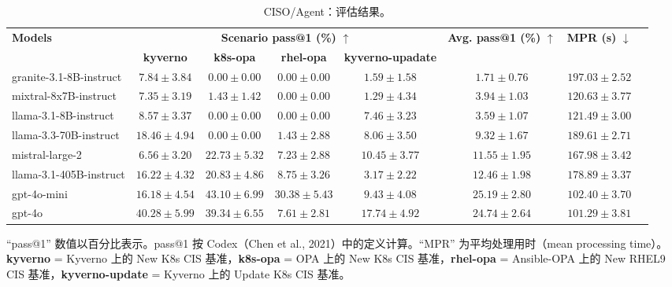 \documentclass[10pt,UTF8,fontset=fandol]{ctexart}
\begin{document}
\begin{table}[H]
\centering
\caption{CISO/Agent：评估结果。}
\label{tab:itbench-24}
\begin{adjustbox}{max width=\linewidth}
\begin{tabular}{lccccccc}
\toprule
\multirow{2}{*}{\textbf{Models}} & \multicolumn{4}{c}{\textbf{Scenario pass@1 (\%)} $\uparrow$} & \multirow{2}{*}{\textbf{Avg. pass@1 (\%)} $\uparrow$} & \multirow{2}{*}{\textbf{MPR (s)} $\downarrow$} \\
\cmidrule(lr){2-5}
 & \textbf{kyverno} & \textbf{k8s-opa} & \textbf{rhel-opa} & \textbf{kyverno-upadate} & & \\
\midrule
granite-3.1-8B-instruct  & $7.84 \pm 3.84$  & $0.00 \pm 0.00$  & $0.00 \pm 0.00$  & $1.59 \pm 1.58$  & $1.71 \pm 0.76$  & $197.03 \pm 2.52$ \\
mixtral-8x7B-instruct    & $7.35 \pm 3.19$  & $1.43 \pm 1.42$  & $0.00 \pm 0.00$  & $1.29 \pm 4.34$  & $3.94 \pm 1.03$  & $120.63 \pm 3.77$ \\
llama-3.1-8B-instruct    & $8.57 \pm 3.37$  & $0.00 \pm 0.00$  & $0.00 \pm 0.00$  & $7.46 \pm 3.23$  & $3.59 \pm 1.07$  & $121.49 \pm 3.00$ \\
llama-3.3-70B-instruct   & $18.46 \pm 4.94$ & $0.00 \pm 0.00$  & $1.43 \pm 2.88$  & $8.06 \pm 3.50$  & $9.32 \pm 1.67$  & $189.61 \pm 2.71$ \\
mistral-large-2          & $6.56 \pm 3.20$  & $22.73 \pm 5.32$ & $7.23 \pm 2.88$  & $10.45 \pm 3.77$ & $11.55 \pm 1.95$ & $167.98 \pm 3.42$ \\
llama-3.1-405B-instruct  & $16.22 \pm 4.32$ & $20.83 \pm 4.86$ & $8.75 \pm 3.26$  & $3.17 \pm 2.22$  & $12.46 \pm 1.98$ & $178.89 \pm 3.37$ \\
gpt-4o-mini              & $16.18 \pm 4.54$ & $43.10 \pm 6.99$ & $30.38 \pm 5.43$ & $9.43 \pm 4.08$  & $25.19 \pm 2.80$ & $102.40 \pm 3.70$ \\
gpt-4o                   & $40.28 \pm 5.99$ & $39.34 \pm 6.55$ & $7.61 \pm 2.81$  & $17.74 \pm 4.92$ & $24.74 \pm 2.64$ & $101.29 \pm 3.81$ \\
\bottomrule
\end{tabular}
\end{adjustbox}
\par\smallskip
\footnotesize\raggedright
``pass@1'' 数值以百分比表示。pass@1 按 Codex（Chen et al., 2021）中的定义计算。``MPR'' 为平均处理用时（mean processing time）。\\
\textbf{kyverno} = Kyverno 上的 New K8s CIS 基准，\textbf{k8s-opa} = OPA 上的 New K8s CIS 基准，\textbf{rhel-opa} = Ansible-OPA 上的 New RHEL9 CIS 基准，\textbf{kyverno-update} = Kyverno 上的 Update K8s CIS 基准。
\end{table}
\end{document}
